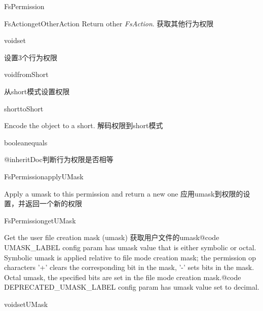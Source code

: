 \begin{XeClass}{FsPermission}
\begin{XeMethod}{\XePublic}{FsAction}{getOtherAction}
 Return other \emph{FsAction}.
 获取其他行为权限

    \end{XeMethod}

    \begin{XeMethod}{\XePrivate}{void}{set}
         
 设置3个行为权限

    \end{XeMethod}

    \begin{XeMethod}{\XePublic}{void}{fromShort}
         
 从short模式设置权限

    \end{XeMethod}

    \begin{XeMethod}{\XePublic}{short}{toShort}
         
 Encode the object to a short.
 解码权限到short模式

    \end{XeMethod}

    \begin{XeMethod}{\XePublic}{boolean}{equals}
         
 {@inheritDoc}判断行为权限是否相等

    \end{XeMethod}

    \begin{XeMethod}{\XePublic}{FsPermission}{applyUMask}
         
 Apply a umask to this permission and return a new one
 应用umask到权限的设置，并返回一个新的权限

    \end{XeMethod}

    \begin{XeMethod}{\XePublic}{FsPermission}{getUMask}
         
 Get the user file creation mask (umask)
 获取用户文件的umask{@code UMASK_LABEL} config param has umask value that is either symbolic
 or octal.
 Symbolic umask is applied relative to file mode creation mask;
 the permission op characters '+' clears the corresponding bit in the mask,
 '-' sets bits in the mask.
 Octal umask, the specified bits are set in the file mode creation mask.{@code DEPRECATED_UMASK_LABEL} config param has umask value set to decimal.

    \end{XeMethod}

    \begin{XeMethod}{\XePublic}{void}{setUMask}
         

\end{XeMethod}
\end{XeClass}
